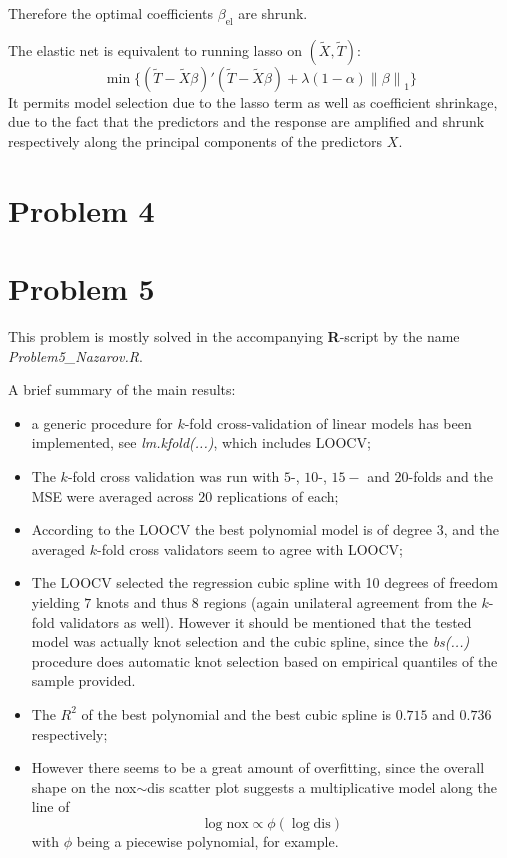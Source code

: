 \documentclass[a4paper]{article}
\newcommand{\nrm}[1]{{\left\| #1 \right \|}}
\begin{document}
Therefore the optimal coefficients $\beta_{\text{el}}$ are shrunk.

The elastic net is equivalent to running lasso on $(\tilde{X}, \tilde{T})$:
\[\min\Big\{ (\tilde{T} - \tilde{X}\beta)'(\tilde{T} - \tilde{X}\beta) + \lambda(1-\alpha)\nrm{\beta}_1 \Big\}\]
It permits model selection due to the lasso term as well as coefficient shrinkage, due to the fact that the predictors and the response are amplified and shrunk respectively along the principal components of the predictors $X$.


\clearpage

\section{Problem 4} %
\label{sec:problem_4}



\clearpage

\section{Problem 5} %
\label{sec:problem_5}

This problem is mostly solved in the accompanying \textbf{R}-script by the name \emph{Problem5\_Nazarov.R}.

A brief summary of the main results:
\begin{itemize}
	\item a generic procedure for $k$-fold cross-validation of linear models has been implemented, see \emph{lm.kfold(...)}, which includes LOOCV;
	\item The $k$-fold cross validation was run with $5$-, $10$-, $15-$ and $20$-folds and the MSE were averaged across $20$ replications of each;
	\item According to the LOOCV the best polynomial model is of degree $3$, and the averaged $k$-fold cross validators seem to agree with LOOCV;
	\item The LOOCV selected the regression cubic spline with 10 degrees of freedom yielding $7$ knots and thus $8$ regions (again unilateral agreement from the $k$-fold validators as well). However it should be mentioned that the tested model was actually knot selection and the cubic spline, since the \emph{bs(...)} procedure does automatic knot selection based on empirical quantiles of the sample provided.
	\item The $R^2$ of the best polynomial and the best cubic spline is $0.715$ and $0.736$ respectively;
	\item However there seems to be a great amount of overfitting, since the overall shape on the nox$\sim$dis scatter plot suggests a multiplicative model along the line of 
	\[\log\text{nox}\propto \phi(\log\text{dis})\]
	with $\phi$ being a piecewise polynomial, for example.
\end{itemize}

\end{document}
